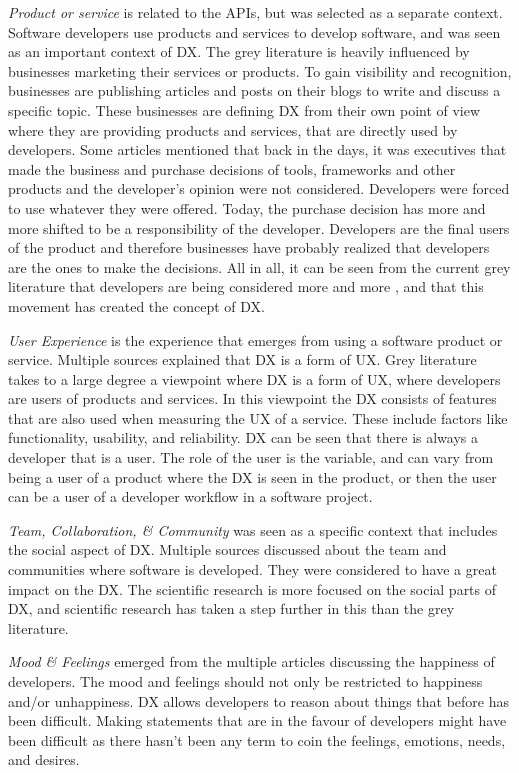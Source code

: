 \documentclass[english, 12pt, a4paper, sci, utf8, a-1b, online]{aaltothesis}
\begin{document}
\textit{Product or service} is related to the APIs, but was selected as a separate context. Software developers use products and services to develop software, and was seen as an important context of DX. The grey literature is heavily influenced by businesses marketing their services or products. To gain visibility and recognition, businesses are publishing articles and posts on their blogs to write and discuss a specific topic. These businesses are defining DX from their own point of view where they are providing products and services, that are directly used by developers. Some articles mentioned that back in the days, it was executives that made the business and purchase decisions of tools, frameworks and other products and the developer's opinion were not considered. Developers were forced to use whatever they were offered. Today, the purchase decision has more and more shifted to be a responsibility of the developer. Developers are the final users of the product and therefore businesses have probably realized that developers are the ones to make the decisions. All in all, it can be seen from the current grey literature that developers are being considered more and more \parencite{dx-devs-are-people-too}, and that this movement has created the concept of DX.

\textit{User Experience} is the experience that emerges from using a software product or service. Multiple sources explained that DX is a form of UX. Grey literature takes to a large degree a viewpoint where DX is a form of UX, where developers are users of products and services. In this viewpoint the DX consists of features that are also used when measuring the UX of a service. These include factors like functionality, usability, and reliability. DX can be seen that there is always a developer that is a user. The role of the user is the variable, and can vary from being a user of a product where the DX is seen in the product, or then the user can be a user of a developer workflow in a software project.

\textit{Team, Collaboration, \& Community} was seen as a specific context that includes the social aspect of DX. Multiple sources discussed about the team and communities where software is developed. They were considered to have a great impact on the DX. The scientific research is more focused on the social parts of DX, and scientific research has taken a step further in this than the grey literature.

\textit{Mood \& Feelings} emerged from the multiple articles discussing the happiness of developers. The mood and feelings should not only be restricted to happiness and/or unhappiness. DX allows developers to reason about things that before has been difficult. Making statements that are in the favour of developers might have been difficult as there hasn't been any term to coin the feelings, emotions, needs, and desires.
\end{document}
